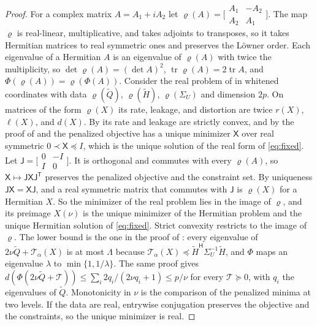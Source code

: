 \documentclass[11pt,onecolumn]{IEEEtran}
\newcommand{\tr}{\operatorname{tr}}
\newcommand{\tQ}{\tilde Q}
\newcommand{\tH}{\tilde H}
\newcommand{\herm}{\mathsf H}
\begin{document}
\begin{proof}
For a complex matrix $A=A_1+iA_2$ let
$\varrho(A)=\bigl[\begin{smallmatrix}A_1&-A_2\\A_2&A_1\end{smallmatrix}\bigr]$.
The map $\varrho$ is real-linear, multiplicative, and takes adjoints to
transposes, so it takes Hermitian matrices to real symmetric ones and
preserves the L\"owner order. Each eigenvalue of a Hermitian $A$ is an
eigenvalue of $\varrho(A)$ with twice the multiplicity, so
$\det\varrho(A)=(\det A)^2$, $\tr\varrho(A)=2\tr A$, and
$\Phi(\varrho(A))=\varrho(\Phi(A))$. Consider the real problem of
\cite{part1} in whitened coordinates with data $\varrho(\tQ)$,
$\varrho(\tH)$, $\varrho(\Sigma_U)$ and dimension $2p$. On matrices of the
form $\varrho(X)$ its rate, leakage, and distortion are twice $r(X)$,
$\ell(X)$, and $d(X)$. By \cite[Theorem~5]{part1} its rate and leakage
are strictly convex, and by the proof of \cite[Theorem~7]{part1} and
\cite[Remark~10]{part1} the penalized objective has a unique minimizer
$\mathsf X$ over real symmetric $0\prec\mathsf X\preceq I$, which is the
unique solution of the real form of \eqref{eq:fixed}. Let
$\mathsf J=\bigl[\begin{smallmatrix}0&-I\\I&0\end{smallmatrix}\bigr]$. It is
orthogonal and commutes with every $\varrho(A)$, so
$\mathsf X\mapsto\mathsf J\mathsf X\mathsf J^{\mathsf T}$ preserves the
penalized objective and the constraint set. By uniqueness
$\mathsf J\mathsf X=\mathsf X\mathsf J$, and a real symmetric matrix that
commutes with $\mathsf J$ is $\varrho(X)$ for a Hermitian $X$. So the
minimizer of the real problem lies in the image of $\varrho$, and its
preimage $X(\nu)$ is the unique minimizer of the Hermitian problem and
the unique Hermitian solution of \eqref{eq:fixed}. Strict convexity
restricts to the image of $\varrho$. The lower bound is the one in the
proof of \cite[Proposition~11]{part1}: every eigenvalue of
$2\nu\tQ+\mathcal T_\alpha(X)$ is at most $\Lambda$ because
$\mathcal T_\alpha(X)\preceq\tH^{\herm}\Sigma_U^{-1}\tH$, and $\Phi$ maps an
eigenvalue $\lambda$ to $\min\{1,1/\lambda\}$. The same proof gives
$d(\Phi(2\nu\tQ+\mathcal T))\le\sum_i2q_i/(2\nu q_i+1)\le p/\nu$ for every
$\mathcal T\succeq0$, with $q_i$ the eigenvalues of $\tQ$. Monotonicity
in $\nu$ is the comparison of the penalized minima at two levels. If
the data are real, entrywise conjugation preserves the objective and
the constraints, so the unique minimizer is real.
\end{proof}
\end{document}

